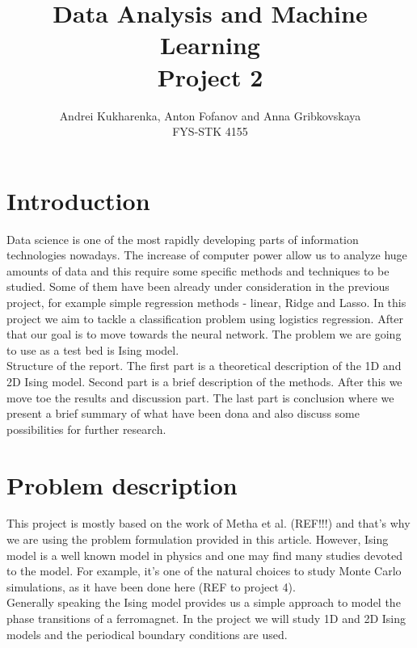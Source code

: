 \documentclass[10pt]{article}
\begin{document}
\setlength\parindent{1pt}
\title{Data Analysis and Machine Learning \\
	Project 2\\ }
\author{Andrei Kukharenka, Anton Fofanov and Anna Gribkovskaya \\  
	FYS-STK 4155 
}

\maketitle
\begin{abstract}
\end{abstract}

\section{Introduction}

Data science is one of the most rapidly developing parts of information technologies nowadays. The increase of computer power allow us to analyze huge amounts of data and this require some specific methods and techniques to be studied. Some of them have been already under consideration in the previous project, for example simple regression methods - linear, Ridge and Lasso. In this project we aim to tackle a classification problem using logistics regression. After that our goal is to move towards the neural network. The problem we are going to use as a test bed is Ising model. \\

Structure of the report. The first part is a theoretical description of the 1D and 2D Ising model. Second part is a brief description of the methods. After this we move toe the results and discussion part. The last part is conclusion where we present a brief summary of what have been dona and also discuss some possibilities for further research.



\section{Problem description}
This project is mostly based on the work of Metha et al. (REF!!!) and that's why we are using the problem formulation provided in this article. However, Ising model is a well known model in physics and one may find many studies devoted to the model. For example, it's one of the natural choices to study Monte Carlo simulations, as it have been done here (REF to project 4).\\
Generally speaking the Ising model provides us a simple approach to model the phase transitions of a ferromagnet. In the project we will study 1D and 2D Ising models and the periodical boundary conditions are used.
\end{document}
